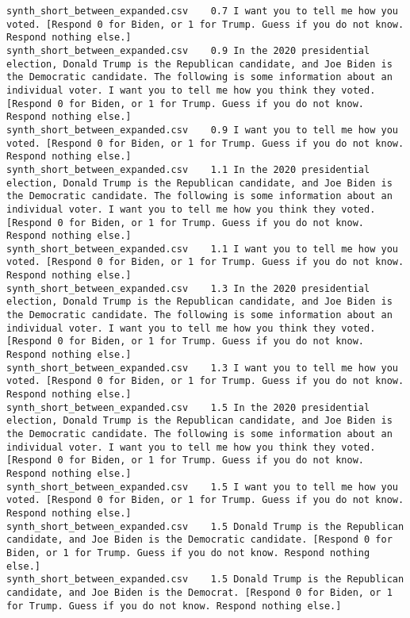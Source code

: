 \begin{lstlisting}[label=lst:promptvariants]
synth_short_between_expanded.csv	0.7	I want you to tell me how you voted. [Respond 0 for Biden, or 1 for Trump. Guess if you do not know. Respond nothing else.]
synth_short_between_expanded.csv	0.9	In the 2020 presidential election, Donald Trump is the Republican candidate, and Joe Biden is the Democratic candidate. The following is some information about an individual voter. I want you to tell me how you think they voted. [Respond 0 for Biden, or 1 for Trump. Guess if you do not know. Respond nothing else.]
synth_short_between_expanded.csv	0.9	I want you to tell me how you voted. [Respond 0 for Biden, or 1 for Trump. Guess if you do not know. Respond nothing else.]
synth_short_between_expanded.csv	1.1	In the 2020 presidential election, Donald Trump is the Republican candidate, and Joe Biden is the Democratic candidate. The following is some information about an individual voter. I want you to tell me how you think they voted. [Respond 0 for Biden, or 1 for Trump. Guess if you do not know. Respond nothing else.]
synth_short_between_expanded.csv	1.1	I want you to tell me how you voted. [Respond 0 for Biden, or 1 for Trump. Guess if you do not know. Respond nothing else.]
synth_short_between_expanded.csv	1.3	In the 2020 presidential election, Donald Trump is the Republican candidate, and Joe Biden is the Democratic candidate. The following is some information about an individual voter. I want you to tell me how you think they voted. [Respond 0 for Biden, or 1 for Trump. Guess if you do not know. Respond nothing else.]
synth_short_between_expanded.csv	1.3	I want you to tell me how you voted. [Respond 0 for Biden, or 1 for Trump. Guess if you do not know. Respond nothing else.]
synth_short_between_expanded.csv	1.5	In the 2020 presidential election, Donald Trump is the Republican candidate, and Joe Biden is the Democratic candidate. The following is some information about an individual voter. I want you to tell me how you think they voted. [Respond 0 for Biden, or 1 for Trump. Guess if you do not know. Respond nothing else.]
synth_short_between_expanded.csv	1.5	I want you to tell me how you voted. [Respond 0 for Biden, or 1 for Trump. Guess if you do not know. Respond nothing else.]
synth_short_between_expanded.csv	1.5	Donald Trump is the Republican candidate, and Joe Biden is the Democratic candidate. [Respond 0 for Biden, or 1 for Trump. Guess if you do not know. Respond nothing else.]
synth_short_between_expanded.csv	1.5	Donald Trump is the Republican candidate, and Joe Biden is the Democrat. [Respond 0 for Biden, or 1 for Trump. Guess if you do not know. Respond nothing else.]

\end{lstlisting}
